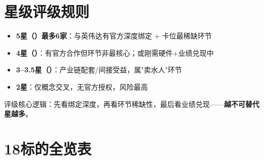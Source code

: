 \section{星级评级规则}

\begin{itemize}[leftmargin=2em]
  \item \textbf{5星（\starfive{}）最多6家}：与英伟达有官方深度绑定 + 卡位最稀缺环节
  \item \textbf{4星（\starfour{}）}：有官方合作但环节非最核心；或刚需硬件+业绩兑现中
  \item \textbf{3--3.5星（\starthree{}）}：产业链配套/间接受益，属"卖水人"环节
  \item \textbf{2星}：仅概念交叉，无官方授权，风险最高
\end{itemize}

评级核心逻辑：先看绑定深度，再看环节稀缺性，最后看业绩兑现——\textbf{越不可替代星越多}。

\section{18标的全览表}

